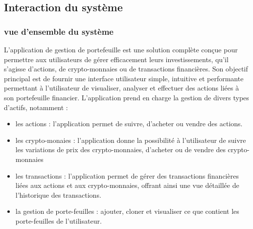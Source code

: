 \documentclass{article}
\begin{document}

\subsection{Interaction du système}

\subsubsection{vue d'ensemble du système}

L'application de gestion de portefeuille est une solution complète conçue pour permettre aux utilisateurs de gérer efficacement leurs investissements, qu'il s'agisse d'actions, de crypto-monnaies ou de transactions financières. Son objectif principal est de fournir une interface utilisateur simple, intuitive et performante permettant à l'utilisateur de visualiser, analyser et effectuer des actions liées à son portefeuille financier.
L'application prend en charge la gestion de divers types d'actifs, notamment :
\begin{itemize}
    \item les actions : l'application permet de suivre, d'acheter ou vendre des actions.
    \item les crypto-monaies : l'application donne la possibilité à l'utilisateur de suivre les variations de prix des crypto-monnaies, d'acheter ou de vendre des crypto-monnaies
    \item les transactions : l'application permet de gérer des transactions financières liées aux actions et aux crypto-monnaies, offrant ainsi une vue détaillée de l'historique des transactions.
    \item la gestion de porte-feuilles : ajouter, cloner et visualiser ce que contient les porte-feuilles de l'utilisateur.
\end{itemize}
\end{document}
